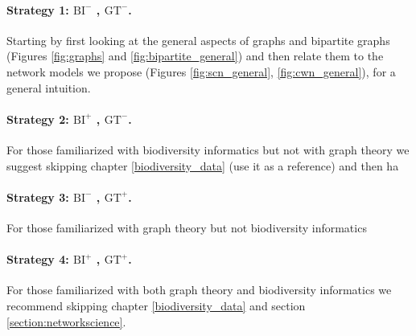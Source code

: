 \paragraph*{Strategy 1: $\text{BI}^-$ , $\text{GT}^-$.} Starting by first looking at the general aspects of graphs and bipartite graphs (Figures \ref{fig:graphs} and \ref{fig:bipartite_general}) and then relate them to the network models we propose (Figures \ref{fig:scn_general}, \ref{fig:cwn_general}), for a general intuition.

\paragraph*{Strategy 2: $\text{BI}^+$ , $\text{GT}^-$.} For those familiarized with biodiversity informatics but not with graph theory we suggest skipping chapter \ref{biodiversity_data} (use it as a reference) and then ha

\paragraph*{Strategy 3: $\text{BI}^-$ , $\text{GT}^+$.} For those familiarized with graph theory but not biodiversity informatics

\paragraph*{Strategy 4: $\text{BI}^+$ , $\text{GT}^+$.} For those familiarized with both graph theory and biodiversity informatics we recommend skipping chapter \ref{biodiversity_data} and section \ref{section:networkscience}.











